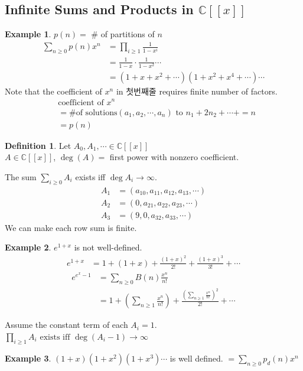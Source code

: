 \documentclass{article}
\theoremstyle{definition}
\newtheorem{defn}{Definition}[]
\newtheorem{ex}{Example}[]
\begin{document}
\subsection{Infinite Sums and Products in $\mathbb{C}[[x]]$}
\begin{ex}
$p(n) =$ $\#$ of partitions of $n$
\begin{align*}
    \sum_{n\ge 0 } p(n) x^n &= \prod_{i\ge 1} \frac{1}{1-x^i} \\ &= \frac{1}{1-x} \cdot \frac{1}{1-x^2} \cdots 
    \\ &= (1+x+x^2 +\cdots)(1+ x^2 + x^4 + \cdots) \cdots 
\end{align*}
Note that the coefficient of $x^n$ in 첫번째줄 requires finite number of factors. \\ 
\begin{align*}
    &\text{coefficient of } x^n \\ 
    &= \# \text{of solutions} (a_1, a_2, \cdots, a_n) 
    \text{ to } n_1 + 2n_2 + \cdots + = n \\ 
    &= p(n)
\end{align*}
\end{ex}
\begin{defn}
Let $A_0, A_1, \cdots \in \mathbb{C}[[x]]$ \\ 
$A \in \mathbb{C}[[x]]$, $\deg{(A)} = $ first power with nonzero coefficient. 
\end{defn}
The sum $\sum_{i\ge 0} A_i$ exists iff $\deg A_i \rightarrow \infty$.
\begin{align*}
    A_1 &= (a_{10}, a_{11}, a_{12}, a_{13}, \cdots) \\ 
    A_2 &= (0, a_{21}, a_{22}, a_{23}, \cdots) \\ 
    A_3 &= (9, 0, a_{32}, a_{33}, \cdots)
\end{align*}
We can make each row sum is finite.
\begin{ex}
    $e^{1+x}$ is not well-defined. 
    \begin{align*}
        e^{1+x} &= 1+ \left(1+x\right) + \frac{(1+x)^2}{2!} + \frac{(1+x)^3}{3!} + \cdots  
    \end{align*}
    \begin{align*}
        e^{e^x - 1} &= \sum_{n \ge 0} B(n) \frac{x^n}{n!} \\ 
        &= 1 + \left(\sum_{n\ge 1} \frac{x^n}{n!}\right) + \frac{\left(
            \sum_{n\ge 1} \frac{x^n}{n!}
        \right)^2}{2!} + \cdots
    \end{align*}
\end{ex} 
Assume the constant term of each $A_i =1$. 
$ \prod_{i\ge 1} A_i \text{ exists iff } \deg(A_i -1) \rightarrow \infty $
\begin{ex}
    $(1+x)(1+x^2)(1+x^3) \cdots $ is well defined.
    $= \sum_{n \ge 0} p_d(n) x^n$
\end{ex}
\end{document}
